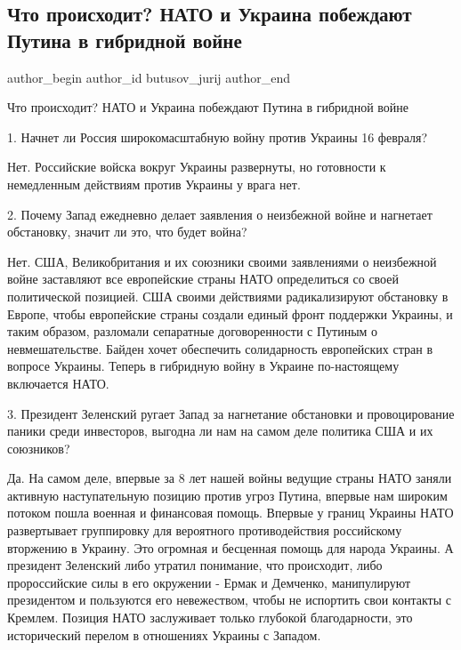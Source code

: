  
 
 
 
 
 
\subsection{Что происходит? НАТО и Украина побеждают Путина в гибридной войне}
\label{sec:12_02_2022.fb.butusov_jurij.1.ukraina_putin_gibrid_vojna}
 
\ifcmt
 author_begin
   author_id butusov_jurij
 author_end
\fi

Что происходит? НАТО и Украина побеждают Путина в гибридной войне

1. Начнет ли Россия широкомасштабную войну против Украины 16 февраля? 

Нет. Российские войска вокруг Украины развернуты, но готовности к немедленным
действиям против Украины у врага нет. 

2. Почему Запад ежедневно делает заявления о неизбежной войне и нагнетает
обстановку, значит ли это, что будет война?

Нет. США, Великобритания и их союзники своими заявлениями о неизбежной войне
заставляют все европейские страны НАТО определиться со своей политической
позицией. США своими действиями радикализируют обстановку в Европе, чтобы
европейские страны создали единый фронт поддержки Украины, и таким образом,
разломали сепаратные договоренности с Путиным о невмешательстве. Байден хочет
обеспечить солидарность европейских стран в вопросе Украины. Теперь в гибридную
войну в Украине по-настоящему включается НАТО. 

3. Президент Зеленский ругает Запад за нагнетание обстановки и провоцирование
паники среди инвесторов, выгодна ли нам на самом деле политика США и их
союзников?

Да. На самом деле, впервые за 8 лет нашей войны ведущие страны НАТО заняли
активную наступательную позицию против угроз Путина, впервые нам широким
потоком пошла военная и финансовая помощь. Впервые у границ Украины НАТО
развертывает группировку для вероятного противодействия российскому вторжению в
Украину. Это огромная и бесценная помощь для народа Украины. А президент
Зеленский либо утратил понимание, что происходит, либо пророссийские силы в его
окружении - Ермак и Демченко, манипулируют президентом и пользуются его
невежеством, чтобы не испортить свои контакты с Кремлем. Позиция НАТО
заслуживает только глубокой благодарности, это исторический перелом в
отношениях Украины с Западом.

